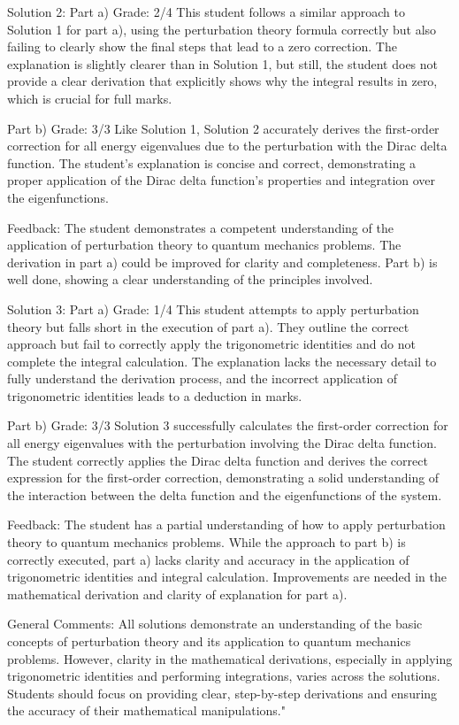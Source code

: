 \documentclass[a4paper,11pt]{article}
\begin{document}
Solution 2:
Part a) Grade: 2/4
This student follows a similar approach to Solution 1 for part a), using the perturbation theory formula correctly but also failing to clearly show the final steps that lead to a zero correction. The explanation is slightly clearer than in Solution 1, but still, the student does not provide a clear derivation that explicitly shows why the integral results in zero, which is crucial for full marks.

Part b) Grade: 3/3
Like Solution 1, Solution 2 accurately derives the first-order correction for all energy eigenvalues due to the perturbation with the Dirac delta function. The student's explanation is concise and correct, demonstrating a proper application of the Dirac delta function's properties and integration over the eigenfunctions.

Feedback:
The student demonstrates a competent understanding of the application of perturbation theory to quantum mechanics problems. The derivation in part a) could be improved for clarity and completeness. Part b) is well done, showing a clear understanding of the principles involved.

Solution 3:
Part a) Grade: 1/4
This student attempts to apply perturbation theory but falls short in the execution of part a). They outline the correct approach but fail to correctly apply the trigonometric identities and do not complete the integral calculation. The explanation lacks the necessary detail to fully understand the derivation process, and the incorrect application of trigonometric identities leads to a deduction in marks.

Part b) Grade: 3/3
Solution 3 successfully calculates the first-order correction for all energy eigenvalues with the perturbation involving the Dirac delta function. The student correctly applies the Dirac delta function and derives the correct expression for the first-order correction, demonstrating a solid understanding of the interaction between the delta function and the eigenfunctions of the system.

Feedback:
The student has a partial understanding of how to apply perturbation theory to quantum mechanics problems. While the approach to part b) is correctly executed, part a) lacks clarity and accuracy in the application of trigonometric identities and integral calculation. Improvements are needed in the mathematical derivation and clarity of explanation for part a).

General Comments:
All solutions demonstrate an understanding of the basic concepts of perturbation theory and its application to quantum mechanics problems. However, clarity in the mathematical derivations, especially in applying trigonometric identities and performing integrations, varies across the solutions. Students should focus on providing clear, step-by-step derivations and ensuring the accuracy of their mathematical manipulations."
\end{document}
